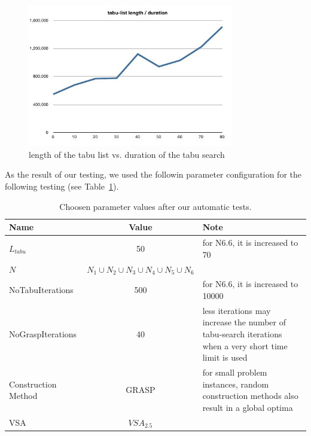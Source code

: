 \documentclass[a4paper,11pt]{article}
\begin{document}
\begin{figure}[htb]
  \begin{center}
    \includegraphics[width=0.8\textwidth]{images/tabulist-len-duration}
  \end{center}
  \caption{length of the tabu list vs. duration of the tabu search}
  \label{fig:tabu_len_dur}
\end{figure}

As the result of our testing, we used the followin parameter configuration for the following testing (see Table~\ref{tab:param-1}).

\begin{center}
  \begin{table}[htb]
    \begin{tabularx}{\linewidth}{| l | c | X | }
      \hline
      Name & Value & Note \\   \hline     \hline
      $L_{tabu}$ & 50 & for N6.6, it is increased to 70 \\ \hline
      $N$ &  $N_1 \cup N_2 \cup N_3 \cup N_4 \cup N_5 \cup N_6$ &  \\ \hline
      NoTabuIterations & 500  &for N6.6, it is increased to 10000 \\ \hline
      NoGraspIterations &  40 & less iterations may increase the number of tabu-search iterations when a very short time limit is used \\ \hline
      Construction Method & GRASP  & for small problem instances, random construction methods also result in a global optima \\ \hline
      VSA & $VSA_{2.5}$  & \\ \hline
    \end{tabularx}
    \caption{Choosen parameter values after our automatic tests.}
  \label{tab:param-1}
  \end{table}
\end{center}
\end{document}
